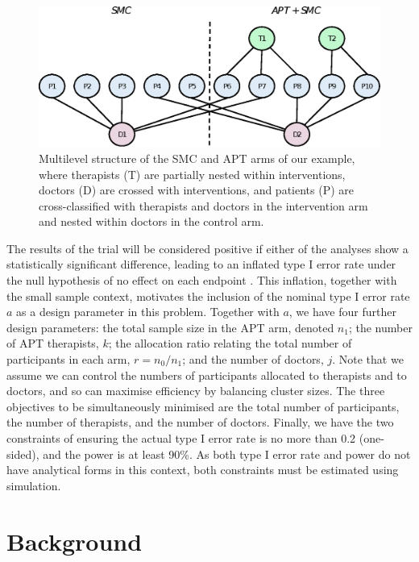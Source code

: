 \documentclass[sagev, Crown]{sagej}
\begin{document}
\begin{figure}
\centering
\includegraphics[scale=0.7]{./figures/ex1_structure.eps}
\caption{Multilevel structure of the SMC and APT arms of our example, where therapists (T) are partially nested within interventions, doctors (D) are crossed with interventions, and patients (P) are cross-classified with therapists and doctors in the intervention arm and nested within doctors in the control arm.}
\label{fig:ex1_structure}
\end{figure}

The results of the trial will be considered positive if either of the analyses show a statistically significant difference, leading to an inflated type I error rate under the null hypothesis of no effect on each endpoint \cite{Senn2007}. This inflation, together with the small sample context, motivates the inclusion of the nominal type I error rate $a$ as a design parameter in this problem. Together with $a$, we have four further design parameters: the total sample size in the APT arm, denoted $n_1$; the number of APT therapists, $k$; the allocation ratio relating the total number of participants in each arm, $r = n_0/n_1$; and the number of doctors, $j$.  Note that we assume we can control the numbers of participants allocated to therapists and to doctors, and so can maximise efficiency by balancing cluster sizes. The three objectives to be simultaneously minimised are the total number of participants, the number of therapists, and the number of doctors. Finally, we have the two constraints of ensuring the actual type I error rate is no more than 0.2 (one-sided), and the power is at least 90\%. As both type I error rate and power do not have analytical forms in this context, both constraints must be estimated using simulation.

\section{Background}\label{sec:prelim}
\end{document}
